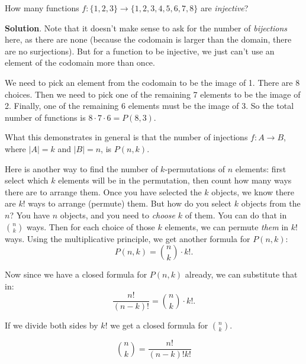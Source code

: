 \documentclass[11pt,]{book}
\theoremstyle{ptxplainnotitle}
\theoremstyle{ptxplaintitle}
\theoremstyle{ptxdefinitionnotitle}
\theoremstyle{ptxdefinitiontitle}
\theoremstyle{ptxdefinitionnotitle}
\theoremstyle{ptxdefinitiontitle}
\theoremstyle{ptxdefinitionnotitle}
\theoremstyle{ptxdefinitiontitle}
\theoremstyle{ptxdefinitiontitlenonumber}
\theoremstyle{ptxdefinitiontitlenonumber}
\numberwithin{equation}{chapter}
\newcommand{\card}[1]{\left| #1 \right|}
\begin{document}
\begin{example}\label{example-counting-functions-injective}
\hypertarget{p-1433}{}%
How many functions \(f:\{1,2,3\} \to \{1,2,3,4,5,6,7,8\}\) are \emph{injective}?%
\par\smallskip%
\noindent\textbf{Solution}.\hypertarget{solution-172}{}\quad%
\hypertarget{p-1434}{}%
Note that it doesn't make sense to ask for the number of \emph{bijections} here, as there are none (because the codomain is larger than the domain, there are no surjections). But for a function to be injective, we just can't use an element of the codomain more than once.%
\par
\hypertarget{p-1435}{}%
We need to pick an element from the codomain to be the image of 1. There are 8 choices. Then we need to pick one of the remaining 7 elements to be the image of 2. Finally, one of the remaining 6 elements must be the image of 3. So the total number of functions is \(8\cdot 7 \cdot 6 = P(8,3)\).%
\par
\hypertarget{p-1436}{}%
What this demonstrates in general is that the number of injections \(f:A \to B\), where \(\card{A} = k\) and \(\card{B} = n\), is \(P(n,k)\).%
\end{example}
\hypertarget{p-1437}{}%
Here is another way to find the number of \(k\)-permutations of \(n\) elements: first select which \(k\) elements will be in the permutation, then count how many ways there are to arrange them. Once you have selected the \(k\) objects, we know there are \(k!\) ways to arrange (permute) them. But how do you select \(k\) objects from the \(n\)? You have \(n\) objects, and you need to \emph{choose} \(k\) of them. You can do that in \({n \choose k}\) ways. Then for each choice of those \(k\) elements, we can permute \emph{them} in \(k!\) ways. Using the multiplicative principle, we get another formula for \(P(n,k)\):%
\begin{equation*}
P(n,k) = {n \choose k}\cdot k!.
\end{equation*}
%
\par
\hypertarget{p-1438}{}%
Now since we have a closed formula for \(P(n,k)\) already, we can substitute that in:%
\begin{equation*}
\frac{n!}{(n-k)!} = {n \choose k} \cdot k!.
\end{equation*}
%
\par
\hypertarget{p-1439}{}%
If we divide both sides by \(k!\) we get a closed formula for \({n \choose k}\).%
\begin{assemblage}\label{assemblage-23}
\hypertarget{p-1440}{}%
%
\begin{equation*}
{n \choose k} = \frac{n!}{(n-k)!k!}
\end{equation*}
%
\end{assemblage}
\end{document}
